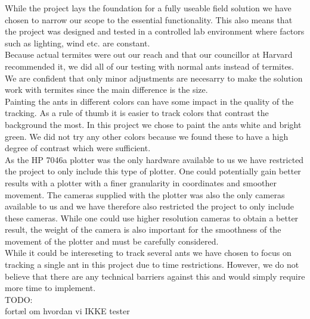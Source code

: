 
While the project lays the foundation for a fully useable field solution we have chosen to narrow our scope to the essential functionality. This also means that the project was designed and tested in a controlled lab environment where factors such as lighting, wind etc. are constant. \\

Because actual termites were out our reach and that our councillor at Harvard recommended it, we did all of our testing with normal ants instead of termites. We are confident that only minor adjustments are necesarry to make the solution work with termites since the main difference is the size. \\

Painting the ants in different colors can have some impact in the quality of the tracking. As a rule of thumb it is easier to track colors that contrast the background the most. In this project we chose to paint the ants white and bright green. We did not try any other colors because we found these to have a high degree of contrast which were sufficient. \\

As the HP 7046a plotter was the only hardware available to us we have restricted the project to only include this type of plotter. One could potentially gain better results with a plotter with a finer granularity in coordinates and smoother movement. The cameras supplied with the plotter was also the only cameras available to us and we have therefore also restricted the project to only include these cameras. While one could use higher resolution cameras to obtain a better result, the weight of the camera is also important for the smoothness of the movement of the plotter and must be carefully considered.\\

While it could be intereseting to track several ants we have chosen to focus on tracking a single ant in this project due to time restrictions. However, we do not believe that there are any technical barriers against this and would simply require more time to implement.\\

TODO: \\
fortæl om hvordan vi IKKE tester

